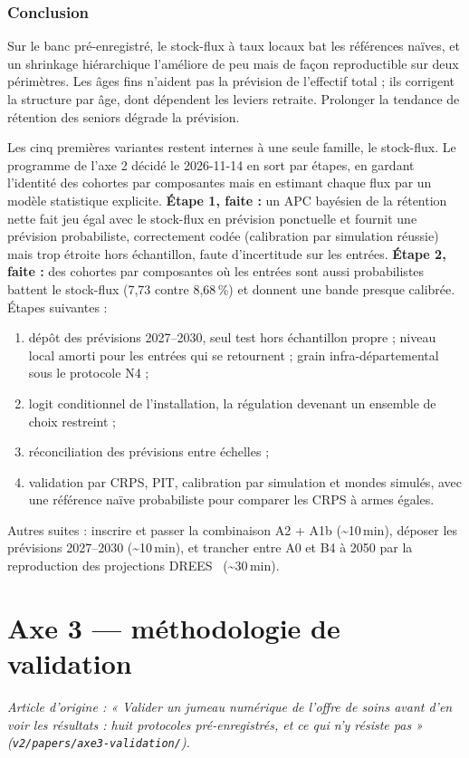 \section{Conclusion}
\label{a2-sec:conclusion}
Sur le banc pré-enregistré, le stock-flux à taux locaux bat les références naïves, et un shrinkage
hiérarchique l'améliore de peu mais de façon reproductible sur deux périmètres. Les âges fins n'aident
pas la prévision de l'effectif total ; ils corrigent la structure par âge, dont dépendent les leviers
retraite. Prolonger la tendance de rétention des seniors dégrade la prévision.

Les cinq premières variantes restent internes à une seule famille, le stock-flux. Le programme de
l'axe 2 décidé le 2026-11-14 en sort par étapes, en gardant l'identité des cohortes par composantes
mais en estimant chaque flux par un modèle statistique explicite. \textbf{Étape 1, faite :} un APC
bayésien de la rétention nette fait jeu égal avec le stock-flux en prévision ponctuelle et fournit une
prévision probabiliste, correctement codée (calibration par simulation réussie) mais trop étroite hors
échantillon, faute d'incertitude sur les entrées. \textbf{Étape 2, faite :} des cohortes par
composantes où les entrées sont aussi probabilistes battent le stock-flux (7,73 contre
8,68\,\%\mesure) et donnent une bande presque calibrée. Étapes suivantes :
\begin{enumerate}
  \item dépôt des prévisions 2027--2030, seul test hors échantillon propre ; niveau local amorti
        pour les entrées qui se retournent ; grain infra-départemental sous le protocole N4 ;
  \item logit conditionnel de l'installation, la régulation devenant un ensemble de choix restreint ;
  \item réconciliation des prévisions entre échelles ;
  \item validation par CRPS, PIT, calibration par simulation et mondes simulés, avec une référence
        naïve probabiliste pour comparer les CRPS à armes égales.
\end{enumerate}
Autres suites : inscrire et passer la combinaison A2 + A1b (\textasciitilde{}10\,min), déposer les
prévisions 2027--2030 (\textasciitilde{}10\,min), et trancher entre A0 et B4 à 2050 par la
reproduction des projections DREES~\cite{a2-drees2021dd76} (\textasciitilde{}30\,min).



\part{Axe 3 --- méthodologie de validation}
\noindent\textit{Article d'origine : « Valider un jumeau numérique de l'offre de soins avant d'en voir les résultats : huit protocoles pré-enregistrés, et ce qui n'y résiste pas » (\texttt{v2/papers/axe3-validation/}).}

